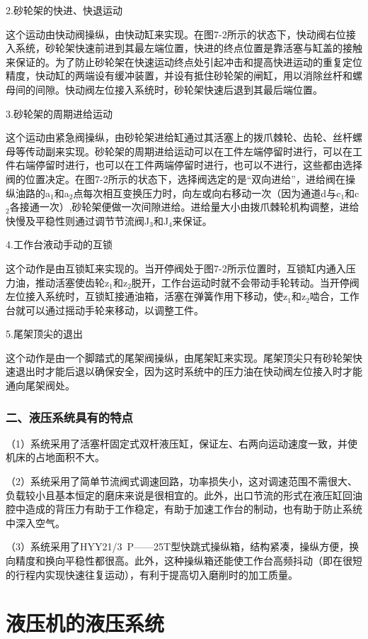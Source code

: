 2.砂轮架的快进、快退运动

这个运动由快动阀操纵，由快动缸来实现。在图7-2所示的状态下，快动阀右位接入系统，砂轮架快速前进到其最左端位置，快进的终点位置是靠活塞与缸盖的接触来保证的。为了防止砂轮架在快速运动终点处引起冲击和提高快进运动的重复定位精度，快动缸的两端设有缓冲装置，并设有抵住砂轮架的闸缸，用以消除丝杆和螺母间的间隙。快动阀左位接入系统时，砂轮架快速后退到其最后端位置。

3.砂轮架的周期进给运动

这个运动由紧急阀操纵，由砂轮架进给缸通过其活塞上的拨爪棘轮、齿轮、丝杆螺母等传动副来实现。砂轮架的周期进给运动可以在工件左端停留时进行，可以在工件右端停留时进行，也可以在工件两端停留时进行，也可以不进行，这些都由选择阀的位置决定。在图7-2所示的状态下，选择阀选定的是“双向进给”，进给阀在操纵油路的a$_1$和a$_2$点每次相互变换压力时，向左或向右移动一次（因为通道d与c$_1$和c$_2$各接通一次）,砂轮架便做一次间隙进给。进给量大小由拨爪棘轮机构调整，进给快慢及平稳性则通过调节节流阀J$_3$和J$_4$来保证。

4.工作台液动手动的互锁

这个动作是由互锁缸来实现的。当开停阀处于图7-2所示位置时，互锁缸内通入压力油，推动活塞使齿轮z$_1$和z$_2$脱开，工作台运动时就不会带动手轮转动。当开停阀左位接入系统时，互锁缸接通油箱，活塞在弹簧作用下移动，使z$_1$和z$_2$啮合，工作台就可以通过摇动手轮来移动，以调整工件。

5.尾架顶尖的退出

这个动作是由一个脚踏式的尾架阀操纵，由尾架缸来实现。尾架顶尖只有砂轮架快速退出时才能后退以确保安全，因为这时系统中的压力油在快动阀左位接入时才能通向尾架阀处。

\subsubsection*{二、液压系统具有的特点}

（1）系统采用了活塞杆固定式双杆液压缸，保证左、右两向运动速度一致，并使机床的占地面积不大。

（2）系统采用了简单节流阀式调速回路，功率损失小，这对调速范围不需很大、负载较小且基本恒定的磨床来说是很相宜的。此外，出口节流的形式在液压缸回油腔中造成的背压力有助于工作稳定，有助于加速工作台的制动，也有助于防止系统中深入空气。

（3）系统采用了HYY21/3\ P——25T型快跳式操纵箱，结构紧凑，操纵方便，换向精度和换向平稳性都很高。此外，这种操纵箱还能使工作台高频抖动（即在很短的行程内实现快速往复运动），有利于提高切入磨削时的加工质量。

\section{液压机的液压系统}

